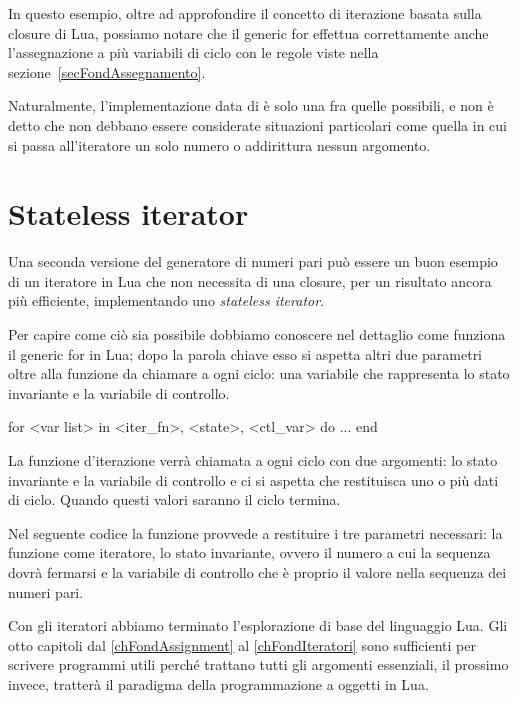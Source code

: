 In questo esempio, oltre ad approfondire il concetto di iterazione basata sulla
closure di Lua, possiamo notare che il generic for effettua correttamente anche
l'assegnazione a più variabili di ciclo con le regole viste nella
sezione~\ref{secFondAssegnamento}.

Naturalmente, l'implementazione data di  è solo una fra quelle
possibili, e non è detto che non debbano essere considerate situazioni
particolari come quella in cui si passa all'iteratore un solo numero o
addirittura nessun argomento.


\section{Stateless iterator}
\label{secFondStatelessIter}

Una seconda versione del generatore di numeri pari può essere un buon esempio
di un iteratore in Lua che non necessita di una closure, per un risultato ancora
più efficiente, implementando uno \emph{stateless iterator}.

Per capire come ciò sia possibile dobbiamo conoscere nel dettaglio come funziona
il generic for in Lua; dopo la parola chiave  esso si aspetta
altri due parametri oltre alla funzione da chiamare a ogni ciclo: una variabile
che rappresenta lo stato invariante e la variabile di controllo.
\begin{lines}
for <var list> in <iter_fn>, <state>, <ctl_var> do
    ...
end
\end{lines}

La funzione d'iterazione verrà chiamata a ogni ciclo con due argomenti: lo stato
invariante e la variabile di controllo e ci si aspetta che restituisca uno o più
dati di ciclo. Quando questi valori saranno  il ciclo termina.

Nel seguente codice la funzione  provvede a restituire i tre
parametri necessari: la funzione  come iteratore, lo stato
invariante, ovvero il numero a cui la sequenza dovrà fermarsi e la variabile di
controllo che è proprio il valore nella sequenza dei numeri pari.

Con gli iteratori abbiamo terminato l'esplorazione di base del linguaggio Lua.
Gli otto capitoli dal \ref{chFondAssignment} al \ref{chFondIteratori} sono
sufficienti per scrivere programmi utili perché trattano tutti gli argomenti
essenziali, il prossimo invece, tratterà il paradigma della programmazione a
oggetti in Lua.


